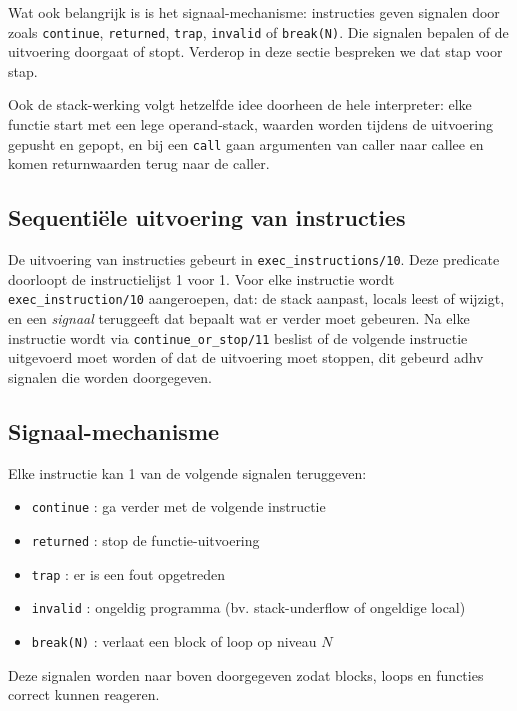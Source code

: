 \documentclass[a4paper,11pt]{article}
\begin{document}
Wat ook belangrijk is is het signaal-mechanisme: instructies geven signalen door zoals
\texttt{continue}, \texttt{returned}, \texttt{trap}, \texttt{invalid} of \texttt{break(N)}.
Die signalen bepalen of de uitvoering doorgaat of stopt. Verderop in deze sectie bespreken we dat stap voor stap.

Ook de stack-werking volgt hetzelfde idee doorheen de hele interpreter: elke functie start met een lege
operand-stack, waarden worden tijdens de uitvoering gepusht en gepopt, en bij een \texttt{call} gaan argumenten
van caller naar callee en komen returnwaarden terug naar de caller.

\subsection*{Sequentiële uitvoering van instructies}

De uitvoering van instructies gebeurt in \texttt{exec\_instructions/10}. Deze predicate doorloopt de instructielijst 1 voor 1.
Voor elke instructie wordt \texttt{exec\_instruction/10} aangeroepen, dat:
de stack aanpast,
locals leest of wijzigt,
en een \emph{signaal} teruggeeft dat bepaalt wat er verder moet gebeuren.
Na elke instructie wordt via \texttt{continue\_or\_stop/11} beslist of de volgende instructie uitgevoerd moet worden of dat de uitvoering moet stoppen,
dit gebeurd adhv signalen die worden doorgegeven.

\subsection*{Signaal-mechanisme}

Elke instructie kan 1 van de volgende signalen teruggeven:

\begin{itemize}
    \item \texttt{continue} : ga verder met de volgende instructie
    \item \texttt{returned} : stop de functie-uitvoering
    \item \texttt{trap} : er is een fout opgetreden
    \item \texttt{invalid} : ongeldig programma (bv. stack-underflow of ongeldige local)
    \item \texttt{break(N)} : verlaat een block of loop op niveau $N$
\end{itemize}

Deze signalen worden naar boven doorgegeven zodat blocks, loops en functies correct kunnen reageren.
\end{document}
